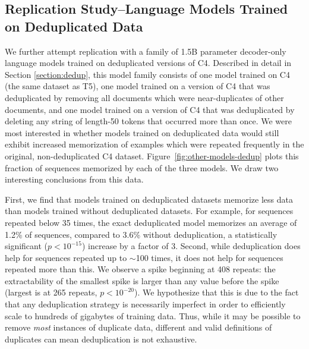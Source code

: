 \subsection{Replication Study--Language Models Trained on Deduplicated Data}

We further attempt replication with a family of 1.5B parameter decoder-only language models trained on deduplicated versions of C4.
Described in detail in Section \ref{section:dedup}, this model family consists of one model trained on C4 (the same dataset as T5), one model trained on a version of C4 that was deduplicated by removing all documents which were near-duplicates of other documents, and one model trained on a version of C4 that was deduplicated by deleting any string of length-50 tokens that occurred more than once.
We were most interested in whether models trained on deduplicated data would still exhibit increased memorization of examples which were repeated frequently in the original, non-deduplicated C4 dataset.
%
Figure~\ref{fig:other-models-dedup} plots this fraction of sequences memorized by each of the three models.
%
We draw two interesting conclusions from this data.


First, we find that models trained on deduplicated datasets memorize less data than models trained without deduplicated datasets.
%
For example, for sequences repeated below 35 times, the exact deduplicated model memorizes an average of 1.2\% of sequences, compared to 3.6\% without deduplication, a statistically significant ($p<10^{-15}$) increase by a factor of 3. 
Second, while deduplication does help for sequences repeated up to $\sim$100 times,
it does not help for sequences repeated more than this.
%
We observe a spike beginning at 408 repeats: the extractability of the smallest spike is larger than any value before the spike (largest is at 265 repeats, $p<10^{-20}$).
%
We hypothesize that this is due to the fact that any deduplication strategy is necessarily
imperfect in order to efficiently scale to hundreds of gigabytes of training data.
%
Thus, while it may be possible to remove \emph{most} instances of duplicate data, different and valid definitions of duplicates can mean deduplication is not exhaustive.


